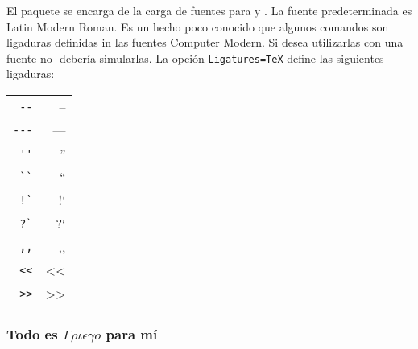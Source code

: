 El paquete \cite{fontspec} se encarga de la carga de fuentes para
 y . La fuente predeterminada es Latin Modern
Roman. Es un hecho poco conocido que algunos comandos  son 
ligaduras definidas in las fuentes Computer Modern. Si desea utilizarlas con 
una fuente no- debería simularlas. La opción \texttt{Ligatures=TeX} 
define las siguientes ligaduras:

\begin{tabular}{rr}
\verb|--| & --\\
\verb|---|  & ---\\
\verb|''| & ''\\
\verb|``| & ``\\
\verb|!`| & !`\\
\verb|?`| & ?`\\
\verb|,,| & ,,\\
\verb|<<| & <<\\
\verb|>>| & >>\\
\end{tabular}


\subsubsection{Todo es $\Gamma\rho\iota\epsilon\gamma o$ para mí}

